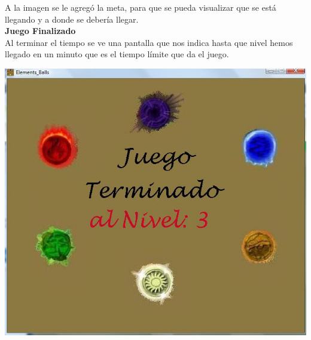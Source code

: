 \documentclass[10pt]{article}
\begin{document}
{\begin{flushleft}
A la imagen se le agreg\'o la meta, para que se pueda visualizar que se est\'a llegando y a donde se deber\'ia llegar.\\\vspace{0.1in}
\textbf{Juego Finalizado}\\
Al terminar el tiempo se ve una pantalla que nos indica hasta que nivel hemos llegado en un minuto que es el tiempo l\'imite que da el juego.
\begin{center}
\includegraphics[scale=0.4]{jugar3}
\end{center}

\newpage

\end{flushleft}}
\end{document}
